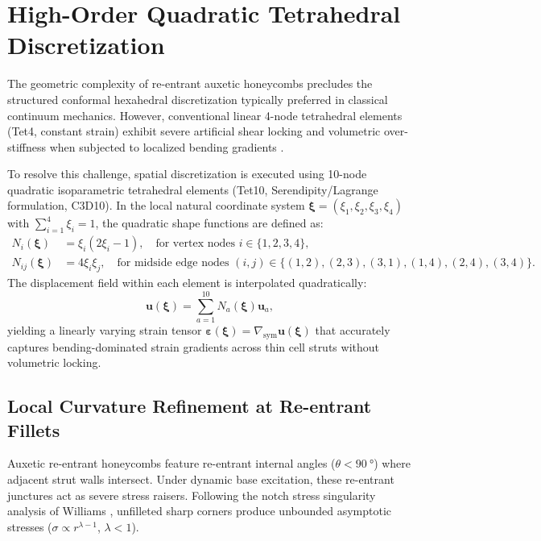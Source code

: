 \section{High-Order Quadratic Tetrahedral Discretization}
\label{sec:fea_mesh_discretization}

The geometric complexity of re-entrant auxetic honeycombs precludes the structured conformal hexahedral discretization typically preferred in classical continuum mechanics. However, conventional linear 4-node tetrahedral elements (Tet4, constant strain) exhibit severe artificial shear locking and volumetric over-stiffness when subjected to localized bending gradients \cite{dhondt2004}. 

To resolve this challenge, spatial discretization is executed using 10-node quadratic isoparametric tetrahedral elements (Tet10, Serendipity/Lagrange formulation, C3D10). In the local natural coordinate system $\boldsymbol{\xi} = (\xi_1, \xi_2, \xi_3, \xi_4)$ with $\sum_{i=1}^4 \xi_i = 1$, the quadratic shape functions are defined as:
\begin{align}
N_i(\boldsymbol{\xi}) &= \xi_i (2\xi_i - 1), \quad \text{for vertex nodes } i \in \{1, 2, 3, 4\}, \label{eq:tet10_vertex} \\
N_{ij}(\boldsymbol{\xi}) &= 4 \xi_i \xi_j, \quad \text{for midside edge nodes } (i, j) \in \{(1,2), (2,3), (3,1), (1,4), (2,4), (3,4)\}. \label{eq:tet10_midside}
\end{align}
The displacement field within each element is interpolated quadratically:
\begin{equation}
\mathbf{u}(\boldsymbol{\xi}) = \sum_{a=1}^{10} N_a(\boldsymbol{\xi}) \mathbf{u}_a,
\label{eq:displacement_quad}
\end{equation}
yielding a linearly varying strain tensor $\boldsymbol{\varepsilon}(\boldsymbol{\xi}) = \nabla_{\text{sym}} \mathbf{u}(\boldsymbol{\xi})$ that accurately captures bending-dominated strain gradients across thin cell struts without volumetric locking.

\subsection{Local Curvature Refinement at Re-entrant Fillets}

Auxetic re-entrant honeycombs feature re-entrant internal angles ($\theta < \SI{90}{\degree}$) where adjacent strut walls intersect. Under dynamic base excitation, these re-entrant junctures act as severe stress raisers. Following the notch stress singularity analysis of Williams \cite{williams1952}, unfilleted sharp corners produce unbounded asymptotic stresses ($\sigma \propto r^{\lambda - 1}$, $\lambda < 1$). 

